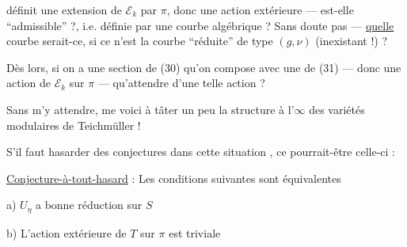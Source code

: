 définit une extension de $\mathcal E_k$ par $\pi$, donc une action extérieure --- est-elle ``admissible'' ?, i.e. définie par une courbe algébrique ? Sans doute pas --- \uline{quelle} courbe serait-ce, si ce n'est la courbe ``réduite'' de type $(g,\nu)$ (inexistant !) ?

Dès lors, si on a une section de (30) qu'on compose avec une de (31) --- donc une action  de $\mathcal E_k$ sur $\pi$ --- qu'attendre d'une telle action ?

Sans m'y attendre, me voici à tâter un peu la structure à l'$\infty$ des variétés modulaires de Teichmüller !

S'il faut hasarder des conjectures dans cette situation , ce pourrait-être celle-ci :

\uline{Conjecture-à-tout-hasard} : Les conditions suivantes sont équivalentes

\noindent a) $U_\eta$ a bonne réduction sur $S$

\noindent b) L'action extérieure de $T$ sur $\pi$ est triviale
